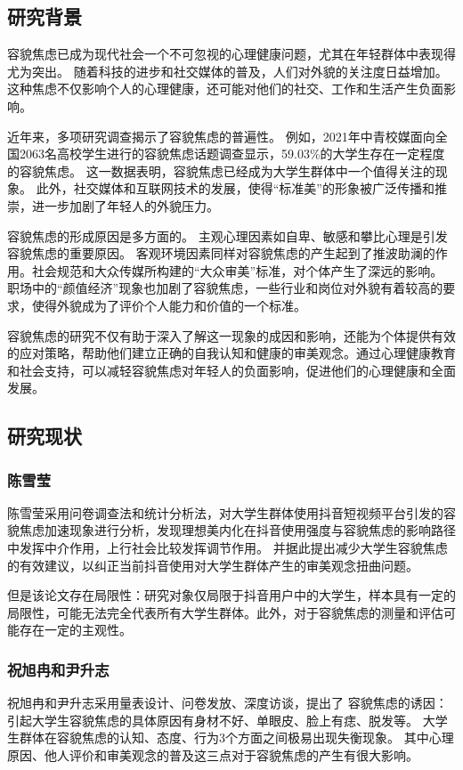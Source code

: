 \subsection{研究背景}
容貌焦虑已成为现代社会一个不可忽视的心理健康问题，尤其在年轻群体中表现得尤为突出。
随着科技的进步和社交媒体的普及，人们对外貌的关注度日益增加。
这种焦虑不仅影响个人的心理健康，还可能对他们的社交、工作和生活产生负面影响。

近年来，多项研究调查揭示了容貌焦虑的普遍性。
例如，2021年中青校媒面向全国2063名高校学生进行的容貌焦虑话题调查显示，59.03\%的大学生存在一定程度的容貌焦虑。
这一数据表明，容貌焦虑已经成为大学生群体中一个值得关注的现象。
此外，社交媒体和互联网技术的发展，使得``标准美''的形象被广泛传播和推崇，进一步加剧了年轻人的外貌压力。

容貌焦虑的形成原因是多方面的。
主观心理因素如自卑、敏感和攀比心理是引发容貌焦虑的重要原因。
客观环境因素同样对容貌焦虑的产生起到了推波助澜的作用。社会规范和大众传媒所构建的``大众审美''标准，对个体产生了深远的影响。
职场中的``颜值经济''现象也加剧了容貌焦虑，一些行业和岗位对外貌有着较高的要求，使得外貌成为了评价个人能力和价值的一个标准。

容貌焦虑的研究不仅有助于深入了解这一现象的成因和影响，还能为个体提供有效的应对策略，帮助他们建立正确的自我认知和健康的审美观念。通过心理健康教育和社会支持，可以减轻容貌焦虑对年轻人的负面影响，促进他们的心理健康和全面发展。

\subsection{研究现状}
\subsubsection{陈雪莹}
陈雪莹采用问卷调查法和统计分析法，对大学生群体使用抖音短视频平台引发的容貌焦虑加速现象进行分析，发现理想美内化在抖音使用强度与容貌焦虑的影响路径中发挥中介作用，上行社会比较发挥调节作用。
并据此提出减少大学生容貌焦虑的有效建议，以纠正当前抖音使用对大学生群体产生的审美观念扭曲问题。\autocite{__2022-3}

但是该论文存在局限性：研究对象仅局限于抖音用户中的大学生，样本具有一定的局限性，可能无法完全代表所有大学生群体。此外，对于容貌焦虑的测量和评估可能存在一定的主观性。


\subsubsection{祝旭冉和尹升志}
祝旭冉和尹升志采用量表设计、问卷发放、深度访谈，提出了
容貌焦虑的诱因：引起大学生容貌焦虑的具体原因有身材不好、单眼皮、脸上有痣、脱发等。
大学生群体在容貌焦虑的认知、态度、行为3个方面之间极易出现失衡现象。
其中心理原因、他人评价和审美观念的普及这三点对于容貌焦虑的产生有很大影响。\autocite{__2023}


